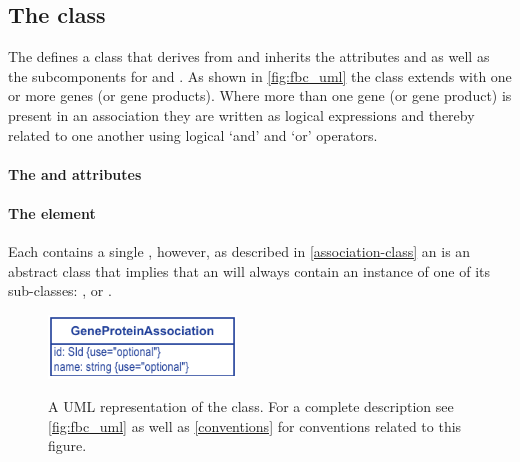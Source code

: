 %


%

%


\subsection{The \FBC {} class}
\label{geneproteinassociation-class}

The \FBCPackage defines a \GeneProteinAssociation class that derives
from \SBase and inherits the attributes  and 
as well as the subcomponents for \Annotation and \Notes. As shown in
\ref{fig:fbc_uml} the \GeneProteinAssociation class extends \Reaction with
one or more genes (or gene products). Where more than one gene (or gene product) is present in an association they are written as logical expressions and thereby related to one another using logical `and' and `or' operators.

\paragraph{The  and  attributes}


\paragraph{The  element}
Each \GeneProteinAssociation contains a single \Association, however, as
described in \ref{association-class} an \Association is an abstract class
that implies that an  will always contain an instance
of one of its sub-classes: \GeneAnd, \GeneOr or \GeneProductRef.
%
\begin{figure}[h!]
  \centering
  \includegraphics[width=5cm]{images/v2harmony_fbc_geneproductassociation.pdf}\\
  \caption{A UML representation of the \FBCPackage \GeneProteinAssociation class.
	For a complete description see \ref{fig:fbc_uml} as well as \ref{conventions} for conventions related to this figure.}
  \label{fig:fbc_uml_ga}
\end{figure}

